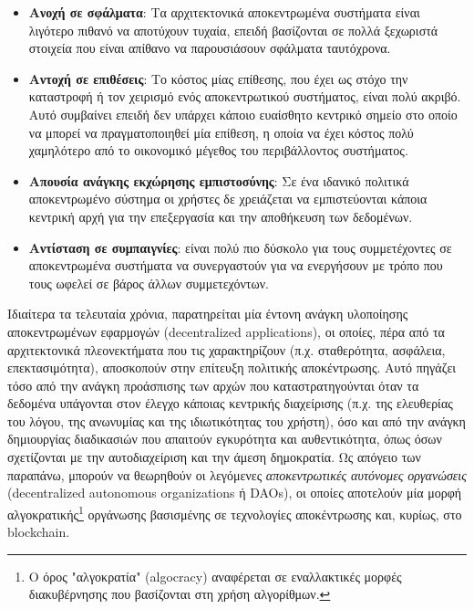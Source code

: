 \begin{itemize}
	\item \textbf{Ανοχή σε σφάλματα}: Τα αρχιτεκτονικά αποκεντρωμένα συστήματα είναι λιγότερο πιθανό να αποτύχουν τυχαία, επειδή βασίζονται σε πολλά ξεχωριστά στοιχεία που είναι απίθανο να παρουσιάσουν σφάλματα ταυτόχρονα.
	\item \textbf{Αντοχή σε επιθέσεις}: Το κόστος μίας επίθεσης, που έχει ως στόχο την καταστροφή ή τον χειρισμό ενός αποκεντρωτικού συστήματος, είναι πολύ ακριβό. Αυτό συμβαίνει επειδή δεν υπάρχει κάποιο ευαίσθητο κεντρικό σημείο στο οποίο να μπορεί να πραγματοποιηθεί μία επίθεση, η οποία να έχει κόστος πολύ χαμηλότερο από το οικονομικό μέγεθος του περιβάλλοντος συστήματος.
	\item \textbf{Απουσία ανάγκης εκχώρησης εμπιστοσύνης}: Σε ένα ιδανικό πολιτικά αποκεντρωμένο σύστημα οι χρήστες δε χρειάζεται να εμπιστεύονται κάποια κεντρική αρχή για την επεξεργασία και την αποθήκευση των δεδομένων. 
	\item \textbf{Αντίσταση σε συμπαιγνίες}: είναι πολύ πιο δύσκολο για τους συμμετέχοντες σε αποκεντρωμένα συστήματα να συνεργαστούν για να ενεργήσουν με τρόπο που τους ωφελεί σε βάρος άλλων συμμετεχόντων.
\end{itemize}

Ιδιαίτερα τα τελευταία χρόνια, παρατηρείται μία έντονη ανάγκη υλοποίησης αποκεντρωμένων εφαρμογών (decentralized applications), οι οποίες, πέρα από τα αρχιτεκτονικά πλεονεκτήματα που τις χαρακτηρίζουν (π.χ. σταθερότητα, ασφάλεια, επεκτασιμότητα), αποσκοπούν στην επίτευξη πολιτικής αποκέντρωσης. Αυτό πηγάζει τόσο από την ανάγκη προάσπισης των αρχών που καταστρατηγούνται όταν τα δεδομένα υπάγονται στον έλεγχο κάποιας κεντρικής διαχείρισης (π.χ. της ελευθερίας του λόγου, της ανωνυμίας και της ιδιωτικότητας του χρήστη), όσο και από την ανάγκη δημιουργίας διαδικασιών που απαιτούν εγκυρότητα και αυθεντικότητα, όπως όσων σχετίζονται με την αυτοδιαχείριση και την άμεση δημοκρατία. Ως απόγειο των παραπάνω, μπορούν να θεωρηθούν οι λεγόμενες \textit{αποκεντρωτικές αυτόνομες οργανώσεις} (decentralized autonomous organizations ή DAOs), οι οποίες αποτελούν μία μορφή αλγοκρατικής\footnote{Ο όρος "αλγοκρατία" (algocracy) αναφέρεται σε εναλλακτικές μορφές διακυβέρνησης που βασίζονται στη χρήση αλγορίθμων.\cite{1.2-virtual-migration}} οργάνωσης βασισμένης σε τεχνολογίες αποκέντρωσης και, κυρίως, στο blockchain.
